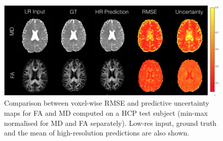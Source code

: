 \begin{figure}[t]
	
	\centering
	\includegraphics[width=\linewidth]{chapter_3/figures/fig_4_2.png}
	\small
	\caption{\footnotesize Comparison between voxel-wise RMSE and predictive uncertainty maps for FA and MD computed on a HCP test subject (min-max normalised for MD and FA separately). Low-res input, ground truth and the mean of high-resolution predictions are also shown.} 
	\label{fig:uncertainty_map}
\end{figure}

